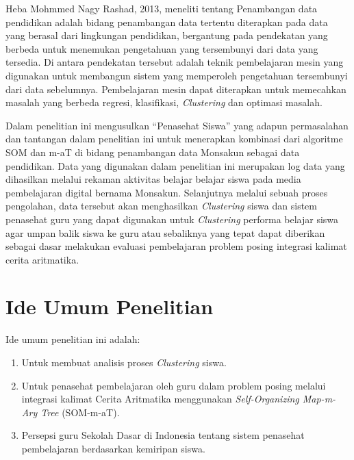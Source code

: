 Heba Mohmmed Nagy Rashad, 2013, meneliti tentang Penambangan data pendidikan adalah bidang penambangan data tertentu diterapkan pada data yang berasal dari lingkungan pendidikan, bergantung pada pendekatan yang berbeda untuk menemukan pengetahuan yang tersembunyi dari data yang tersedia. Di antara pendekatan tersebut adalah teknik pembelajaran mesin yang digunakan untuk membangun sistem yang memperoleh pengetahuan tersembunyi dari data sebelumnya. Pembelajaran mesin dapat diterapkan untuk memecahkan masalah yang berbeda regresi, klasifikasi, \textit{Clustering} dan optimasi masalah. 

Dalam penelitian ini mengusulkan “Penasehat Siswa” yang adapun permasalahan dan tantangan dalam penelitian ini untuk menerapkan kombinasi dari algoritme SOM dan m-aT di bidang penambangan data Monsakun sebagai data pendidikan. Data yang digunakan dalam penelitian ini merupakan log data yang dihasilkan melalui rekaman aktivitas belajar belajar siswa pada media pembelajaran digital bernama Monsakun. Selanjutnya melalui sebuah proses pengolahan, data tersebut akan menghasilkan \textit{Clustering} siswa dan sistem penasehat guru yang dapat digunakan untuk \textit{Clustering} performa belajar siswa agar umpan balik siswa ke guru atau sebaliknya yang tepat dapat diberikan sebagai dasar melakukan evaluasi pembelajaran problem posing integrasi kalimat  cerita aritmatika.

\section{Ide Umum Penelitian}
Ide umum penelitian ini adalah:
\begin{enumerate}
	\item Untuk membuat analisis proses \textit{Clustering} siswa.
	\item Untuk penasehat pembelajaran oleh guru dalam problem posing melalui integrasi kalimat Cerita Aritmatika menggunakan \textit{Self-Organizing Map-m-Ary Tree} (SOM-m-aT).
	\item Persepsi guru Sekolah Dasar di Indonesia tentang sistem penasehat pembelajaran berdasarkan kemiripan siswa.
\end{enumerate}

